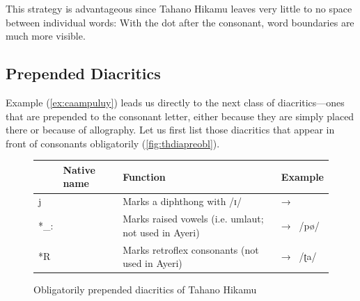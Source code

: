 This strategy is advantageous since Tahano Hikamu leaves very little to no 
space between individual words:  With the dot after the consonant, word boundaries are much more 
visible.

\subsection{Prepended Diacritics}

Example (\ref{ex:caampuluy}) leads us directly to the next class of 
diacritics---ones that are prepended to the consonant letter, either because 
they are simply placed there or because of allography. Let us first list those 
diacritics that appear in front of consonants obligatorily 
(\autoref{fig:thdiapreobl}).

\begin{figure}[htp]
\caption{Obligatorily prepended diacritics of Tahano Hikamu}
\begin{tabu} to 
\toprule
\tableheaderfont

	& Native name
	& Function
	& Example
	\\
	
\toprule

*j
	& 
	& Marks a diphthong with /ɪ/
	&  → 
	\\
	
\midrule

*\_:
	& 
	& Marks raised vowels (i.e. umlaut; not used in Ayeri)
	&  → ~/pø/
	\\
	
\midrule

*R
	& 
	& Marks retroflex consonants (not used in Ayeri)\footnotemark
	&  → ~/ʈa/
	\\

\bottomrule
\end{tabu}
\label{fig:thdiapreobl}
\end{figure}


